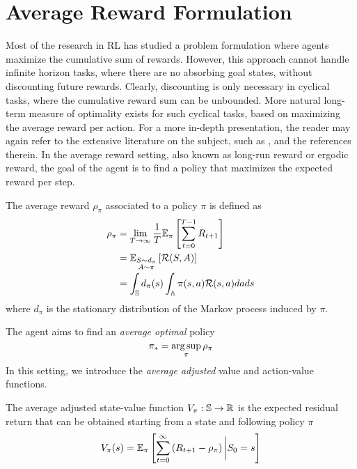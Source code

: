 \section{Average Reward Formulation}
Most of the research in RL has studied a problem formulation where agents
maximize the cumulative sum of rewards. However, this approach cannot handle
infinite horizon tasks, where there are no absorbing goal states, without
discounting future rewards. Clearly, discounting is only necessary in cyclical
tasks, where the cumulative reward sum can be unbounded. More natural long-term
measure of  optimality exists for such cyclical tasks, based on maximizing the
average reward per action. For a more in-depth presentation, the reader may again refer to the extensive literature on the subject, such as \cite{arapostathis1993discrete}, \cite{mahadevan1996average} and the references therein. In the average reward setting, also known as long-run reward or ergodic reward, the goal of the agent is to find a policy that maximizes the expected reward per step. 
\begin{definition}
	The average reward $\rho_\pi$ associated to a policy $\pi$ is defined as  
	\begin{equation}
		\begin{split}
			\rho_\pi &= \lim_{T\to\infty} \frac{1}{T} \E[\pi]{ \sum^{T-1}_{t=0} R_{t+1}}\\
					 &= \E[\substack{S\sim d_\pi \\ A \sim \pi}]{\calR(S,A)}\\ 
					 &= \int_\S d_\pi(s) \int_\A \pi(s, a) \calR(s,a) da ds\\ 
		\end{split}
	\end{equation}
where $d_\pi$ is the stationary distribution of the Markov process induced by $\pi$.
\end{definition}
The agent aims to find an \emph{average optimal} policy
\begin{equation}
	\pi_* = \argsup_\pi \rho_\pi
\end{equation}
In this setting, we introduce the \emph{average adjusted} value and action-value 
functions. 
\begin{definition}
	The average adjusted state-value function $V_\pi : \S \to \R$ is the
	expected residual return that can be obtained starting from a state and
	following policy $\pi$
	\begin{equation}
		V_\pi(s) = \E[\pi]{\sum^{\infty}_{t=0} \left(R_{t+1} - \rho_\pi\right)
		\bigg| S_0 = s}
	\end{equation}
\end{definition}
